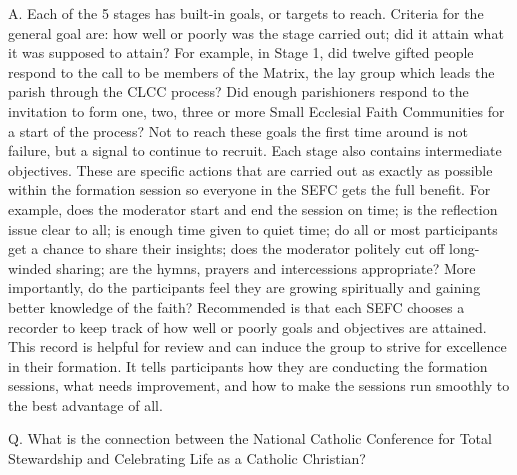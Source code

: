 \documentclass[oneside]{book}
\begin{document}
A. Each of the 5 stages has built-in goals, or targets to reach. Criteria for
the general goal are: how well or poorly was the stage carried out; did it
attain what it was supposed to attain? For example, in Stage 1, did twelve
gifted people respond to the call to be members of the Matrix, the lay group
which leads the parish through the CLCC process? Did enough parishioners respond
to the invitation to form one, two, three or more Small Ecclesial Faith
Communities for a start of the process? Not to reach these goals the first time
around is not failure, but a signal to continue to recruit.  Each stage also
contains intermediate objectives. These are specific actions that are carried
out as exactly as possible within the formation session so everyone in the SEFC
gets the full benefit. For example, does the moderator start and end the session
on time; is the reflection issue clear to all; is enough time given to quiet
time; do all or most participants get a chance to share their insights; does the
moderator politely cut off long-winded sharing; are the hymns, prayers and
intercessions appropriate? More importantly, do the participants feel they are
growing spiritually and gaining better knowledge of the faith?  Recommended is
that each SEFC chooses a recorder to keep track of how well or poorly goals and
objectives are attained. This record is helpful for review and can induce the
group to strive for excellence in their formation. It tells participants how
they are conducting the formation sessions, what needs improvement, and how to
make the sessions run smoothly to the best advantage of all.


Q. What is the connection between the National Catholic Conference for Total
Stewardship and Celebrating Life as a Catholic Christian?
\end{document}
